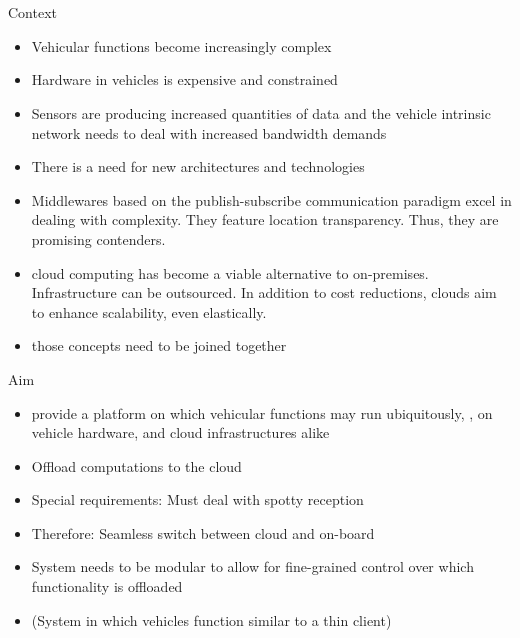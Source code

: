 \chapter{\abstractname}

Context
\begin{itemize}
\item Vehicular functions become increasingly complex
\item Hardware in vehicles is expensive and constrained
\item Sensors are producing increased quantities of data and the vehicle intrinsic network needs to deal with increased bandwidth demands
\item There is a need for new architectures and technologies
\item Middlewares based on the publish-subscribe communication paradigm excel in dealing with complexity. They feature location transparency. Thus, they are promising contenders. 
\item cloud computing has become a viable alternative to on-premises. Infrastructure can be outsourced. In addition to cost reductions, clouds aim to enhance scalability, even elastically.
\item those concepts need to be joined together
\end{itemize}


Aim
\begin{itemize}
\item provide a platform on which vehicular functions may run ubiquitously, \ie , on vehicle hardware, and cloud infrastructures alike
\item Offload computations to the cloud
\item Special requirements: Must deal with spotty reception
\item Therefore: Seamless switch between cloud and on-board
\item System needs to be modular to allow for fine-grained control over which functionality is offloaded 
\item (System in which vehicles function similar to a thin client)
\end{itemize}

